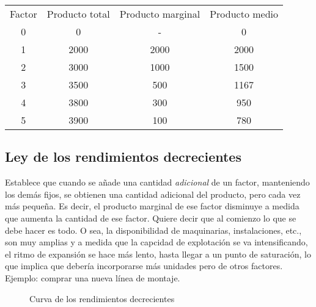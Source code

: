 \vspace{.5cm}
\begin{table}[H]
    \centering
    \begin{tabular}{cccc}
        \hline
        Factor & Producto total & Producto marginal & Producto medio \\
        0      & 0              & -                 & 0              \\
        1      & 2000           & 2000              & 2000           \\
        2      & 3000           & 1000              & 1500           \\
        3      & 3500           & 500               & 1167           \\
        4      & 3800           & 300               & 950            \\
        5      & 3900           & 100               & 780            \\
        \hline
    \end{tabular}
\end{table}
\vspace{.5cm}

\subsection{Ley de los rendimientos decrecientes}

Establece que cuando se añade una cantidad \textit{adicional} de un factor,
manteniendo los demás fijos,
se obtienen una cantidad adicional del producto,
pero cada vez más pequeña.
Es decir, 
el producto marginal de ese factor disminuye a medida que aumenta la cantidad de
ese factor.
Quiere decir que al comienzo lo que se debe hacer es todo.
O sea,
la disponibilidad de maquinarias, instalaciones, etc., son muy amplias 
y a medida que la capcidad de explotación se va intensificando,
el ritmo de expansión se hace más lento,
hasta llegar a un punto de saturación,
lo que implica que debería incorporarse más unidades pero de otros factores.
Ejemplo: comprar una nueva línea de montaje.


\vspace{.5cm}
\begin{figure}[H]
    \centering
    \caption{Curva de los rendimientos decrecientes}
    \vspace{.25cm}
\end{figure}
\vspace{.5cm}

